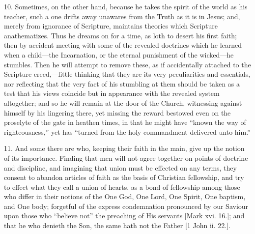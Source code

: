 10. Sometimes, on the other hand, because he takes the spirit of
the world as his teacher, such a one drifts away unawares from the
Truth as it is in Jesus; and, merely from ignorance of Scripture,
maintains theories which Scripture anathematizes. Thus he dreams on
for a time, as loth to desert his first faith; then by accident
meeting with some of the revealed doctrines which he learned when a
child—the Incarnation, or the eternal punishment of the wicked—he
stumbles. Then he will attempt to remove these, as if accidentally
attached to the Scripture creed,—little thinking that they are its
very peculiarities and essentials, nor reflecting that the very fact
of his stumbling at them should be taken as a test that his views
coincide but in appearance with the revealed system altogether; and so
he will remain at the door of the Church, witnessing against himself
by his lingering there, yet missing the reward bestowed even on the
proselyte of the gate in heathen times, in that he might have
``known the way of righteousness,'' yet has ``turned from
the holy commandment delivered unto him.''

11. And some there are who, keeping their faith in the main, give
up the notion of its importance. Finding that men will not agree
together on points of doctrine and discipline, and imagining that
union must be effected on any terms, they consent to abandon articles
of faith as the basis of Christian fellowship, and try to effect what
they call a union of hearts, as a bond of fellowship among those who
differ in their notions of the One God, One Lord, One Spirit, One
baptism, and One body; forgetful of the express condemnation
pronounced by our Saviour upon those who ``believe not'' the
preaching of His servants [Mark xvi. 16.]; and that he who denieth the
Son, the same hath not the Father [1 John ii. 22.].

